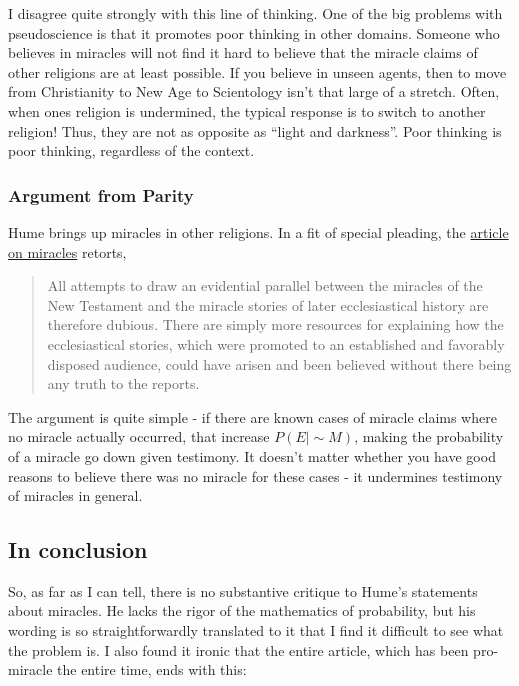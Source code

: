 I disagree quite strongly with this line of thinking. One of the big
problems with pseudoscience is that it promotes poor thinking in other
domains. Someone who believes in miracles will not find it hard to
believe that the miracle claims of other religions are at least
possible. If you believe in unseen agents, then to move from
Christianity to New Age to Scientology isn't that large of a stretch.
Often, when ones religion is undermined, the typical response is to
switch to another religion! Thus, they are not as opposite as ``light
and darkness''. Poor thinking is poor thinking, regardless of the
context.

\subsubsection{Argument from Parity}\label{argument-from-parity}

Hume brings up miracles in other religions. In a fit of special
pleading, the \href{http://plato.stanford.edu/entries/miracles/}{article
on miracles} retorts,

\begin{quote}
All attempts to draw an evidential parallel between the miracles of the
New Testament and the miracle stories of later ecclesiastical history
are therefore dubious. There are simply more resources for explaining
how the ecclesiastical stories, which were promoted to an established
and favorably disposed audience, could have arisen and been believed
without there being any truth to the reports.
\end{quote}

The argument is quite simple - if there are known cases of miracle
claims where no miracle actually occurred, that increase
\(P(E|\sim\!M)\), making the probability of a miracle go down given
testimony. It doesn't matter whether you have good reasons to believe
there was no miracle for these cases - it undermines testimony of
miracles in general.

\subsection{In conclusion}\label{in-conclusion}

So, as far as I can tell, there is no substantive critique to Hume's
statements about miracles. He lacks the rigor of the mathematics of
probability, but his wording is so straightforwardly translated to it
that I find it difficult to see what the problem is. I also found it
ironic that the entire article, which has been pro-miracle the entire
time, ends with this:

